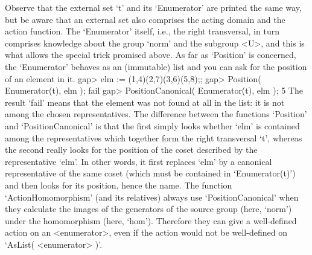 %

Observe  that the external set `t'  and  its `Enumerator' are printed the
same way, but  be aware that an   external set also comprises  the acting
domain  and the action function.  The  `Enumerator' itself, i.e.,  the
right transversal, in turn comprises knowledge about the group `norm' and
the  subgroup <U>,  and  this is what  allows  the special trick promised
above. As far as `Position' is  concerned, the `Enumerator' behaves as an
(immutable) list and you can ask for the position of an element in it.
\beginexample
gap> elm := (1,4)(2,7)(3,6)(5,8);;
gap> Position( Enumerator(t), elm );
fail
gap> PositionCanonical( Enumerator(t), elm );
5
\endexample
{}
The result `fail'   means that the element was   not found at  all in the
list: it is not among the chosen  representatives. The difference between
the functions `Position' and `PositionCanonical' is that the first simply
looks whether `elm' is contained among the representatives which together
form the  right transversal `t', whereas  the second really looks for the
position of the  coset described by  the  representative `elm'. In  other
words, it first replaces `elm' by a  canonical representative of the same
coset (which must be contained in `Enumerator(t)') and then looks for its
position, hence the name. The  function `ActionHomomorphism' (and  its
relatives) always use  `PositionCanonical' when they calculate the images
of   the  generators of  the    source  group (here,  `norm')   under the
homomorphism  (here, `hom').  Therefore  they  can  give a   well-defined
action on an   <enumerator>, even   if the   action  would not   be
well-defined on `AsList( <enumerator> )'.

